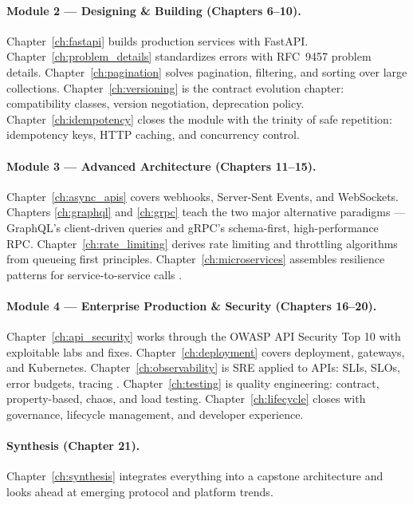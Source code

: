 \paragraph{Module 2 --- Designing \& Building (Chapters 6--10).}
Chapter~\ref{ch:fastapi} builds production services with FastAPI.
Chapter~\ref{ch:problem_details} standardizes errors with RFC~9457 problem
details. Chapter~\ref{ch:pagination} solves pagination, filtering, and
sorting over large collections. Chapter~\ref{ch:versioning} is the contract
evolution chapter: compatibility classes, version negotiation, deprecation
policy. Chapter~\ref{ch:idempotency} closes the module with the trinity of
safe repetition: idempotency keys, HTTP caching, and concurrency control.

\paragraph{Module 3 --- Advanced Architecture (Chapters 11--15).}
Chapter~\ref{ch:async_apis} covers webhooks, Server-Sent Events, and
WebSockets. Chapters \ref{ch:graphql} and \ref{ch:grpc} teach the two major
alternative paradigms --- GraphQL's client-driven queries and gRPC's
schema-first, high-performance RPC. Chapter~\ref{ch:rate_limiting} derives
rate limiting and throttling algorithms from queueing first principles.
Chapter~\ref{ch:microservices} assembles resilience patterns for
service-to-service calls \cite{newman2021microservices}.

\paragraph{Module 4 --- Enterprise Production \& Security (Chapters 16--20).}
Chapter~\ref{ch:api_security} works through the OWASP API Security Top 10
with exploitable labs and fixes. Chapter~\ref{ch:deployment} covers
deployment, gateways, and Kubernetes. Chapter~\ref{ch:observability} is SRE
applied to APIs: SLIs, SLOs, error budgets, tracing \cite{beyer2016sre}.
Chapter~\ref{ch:testing} is quality engineering: contract, property-based,
chaos, and load testing. Chapter~\ref{ch:lifecycle} closes with governance,
lifecycle management, and developer experience.

\paragraph{Synthesis (Chapter 21).}
Chapter~\ref{ch:synthesis} integrates everything into a capstone
architecture and looks ahead at emerging protocol and platform trends.

